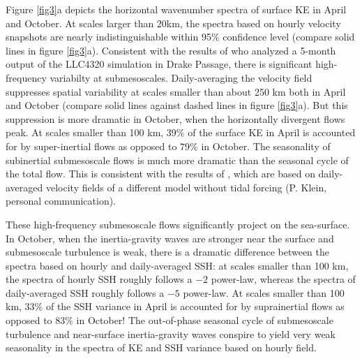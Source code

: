 \documentclass[grl]{agutex2015}
\begin{document}
\begin{article}
Figure \ref{fig3}a depicts the horizontal wavenumber spectra of surface KE in
April and October. At scales larger than 20km, the spectra based on hourly
velocity snapshots are nearly indistinguishable within 95$\%$ confidence level
(compare solid lines in figure \ref{fig3}a). Consistent with the results of
\citet{rocha_etal2016} who analyzed a 5-month output of the LLC4320 simulation in Drake Passage,
there is significant high-frequency variabilty at submesoscales. Daily-averaging
the velocity field suppresses spatial variability at scales smaller than about 250
km both in April and October (compare solid lines against dashed lines in figure
\ref{fig3}a). But this suppression is more dramatic in October, when the horizontally
divergent flows peak. At scales
smaller than 100 km, 39$\%$ of the surface KE in April is accounted for by super-inertial
flows as opposed to 79$\%$ in October. The seasonality of subinertial submesoscale flows
is much more dramatic than the seasonal cycle of the total flow. This is consistent
with the results of \citet{sasaki_etal2014}, which are
based on daily-averaged velocity fields of a different model without tidal forcing
(P. Klein, personal communication).

These high-frequency submesoscale flows significantly project on the sea-surface.
In October, when the inertia-gravity waves are stronger near the surface and submesoscale
turbulence is weak, there is a dramatic difference between the spectra
based on hourly and daily-averaged SSH: at scales smaller than 100 km, the spectra
of hourly SSH roughly follows a $-2$ power-law, whereas the spectra of daily-averaged
SSH roughly follows a $-5$ power-law. At scales
smaller than 100 km, 33$\%$ of the SSH variance in April is accounted for by suprainertial
flows as opposed to 83$\%$ in October! The out-of-phase seasonal cycle of submesoscale
turbulence and near-surface inertia-gravity waves conspire to yield very weak seasonality
in the spectra of KE and SSH variance based on hourly field.



\end{article}
\end{document}
